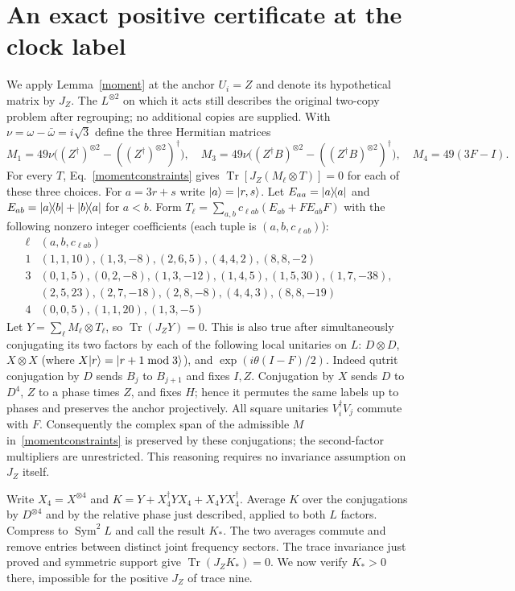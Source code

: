 \documentclass[10pt]{article}
\DeclareMathOperator{\Tr}{Tr}\DeclareMathOperator{\Sym}{Sym}
\begin{document}
\section{An exact positive certificate at the clock label}
We apply Lemma~\ref{moment} at the anchor $U_i=Z$ and denote its hypothetical matrix by $J_Z$. The $L^{\otimes2}$ on which it acts still describes the original two-copy problem after regrouping; no additional copies are supplied. With $\nu=\omega-\bar\omega=i\sqrt3$ define the three Hermitian matrices
\[
 M_1=49\nu\big((Z^\dagger)^{\otimes2}-((Z^\dagger)^{\otimes2})^\dagger\big),\quad
 M_3=49\nu\big((Z^\dagger B)^{\otimes2}-((Z^\dagger B)^{\otimes2})^\dagger\big),
 \quad M_4=49(3F-I).
\]
For every $T$, Eq.~\eqref{momentconstraints} gives $\Tr[J_Z(M_\ell\otimes T)]=0$ for each of these three choices.
For $a=3r+s$ write $|a\rangle=|r,s\rangle$. Let $E_{aa}=|a\rangle\!\langle a|$ and $E_{ab}=|a\rangle\!\langle b|+|b\rangle\!\langle a|$ for $a<b$. Form $T_\ell=\sum_{a,b}c_{\ell ab}(E_{ab}+FE_{ab}F)$ with the following nonzero integer coefficients (each tuple is $(a,b,c_{\ell ab})$):
\[
\begin{array}{c|l}
 \ell & (a,b,c_{\ell ab})\\ \hline
 1 &(1,1,10),(1,3,-8),(2,6,5),(4,4,2),(8,8,-2)\\
 3 &(0,1,5),(0,2,-8),(1,3,-12),(1,4,5),(1,5,30),(1,7,-38),\\
   & (2,5,23),(2,7,-18),(2,8,-8),(4,4,3),(8,8,-19)\\
 4 &(0,0,5),(1,1,20),(1,3,-5)
\end{array}
\]
Let $Y=\sum_\ell M_\ell\otimes T_\ell$, so $\Tr(J_ZY)=0$. This is also true after simultaneously conjugating its two factors by each of the following local unitaries on $L$: $D\otimes D$, $X\otimes X$ (where $X|r\rangle=|r+1\bmod3\rangle$), and $\exp(i\theta (I-F)/2)$. Indeed qutrit conjugation by $D$ sends $B_j$ to $B_{j+1}$ and fixes $I,Z$. Conjugation by $X$ sends $D$ to $D^4$, $Z$ to a phase times $Z$, and fixes $H$; hence it permutes the same labels up to phases and preserves the anchor projectively. All square unitaries $V_i^\dagger V_j$ commute with $F$. Consequently the complex span of the admissible $M$ in~\eqref{momentconstraints} is preserved by these conjugations; the second-factor multipliers are unrestricted. This reasoning requires no invariance assumption on $J_Z$ itself.

Write $X_4=X^{\otimes4}$ and $K=Y+X_4^\dagger YX_4+X_4 YX_4^\dagger$. Average $K$ over the conjugations by $D^{\otimes4}$ and by the relative phase just described, applied to both $L$ factors. Compress to $\Sym^2 L$ and call the result $K_*$. The two averages commute and remove entries between distinct joint frequency sectors. The trace invariance just proved and symmetric support give $\Tr(J_Z K_*)=0$. We now verify $K_*>0$ there, impossible for the positive $J_Z$ of trace nine.
\end{document}

